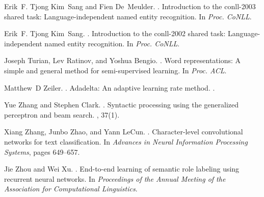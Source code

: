 \documentclass[11pt,letterpaper]{article}
\begin{document}
\begin{thebibliography}{}
Erik~F. Tjong Kim~Sang and Fien De~Meulder.
.
\newblock Introduction to the conll-2003 shared task: Language-independent
  named entity recognition.
\newblock In {\em Proc. CoNLL}.

Erik~F. Tjong Kim~Sang.
.
\newblock Introduction to the conll-2002 shared task: Language-independent
  named entity recognition.
\newblock In {\em Proc. CoNLL}.

Joseph Turian, Lev Ratinov, and Yoshua Bengio.
.
\newblock Word representations: A simple and general method for semi-supervised
  learning.
\newblock In {\em Proc. ACL}.

Matthew~D Zeiler.
.
\newblock Adadelta: An adaptive learning rate method.
.

Yue Zhang and Stephen Clark.
.
\newblock Syntactic processing using the generalized perceptron and beam
  search.
, 37(1).

Xiang Zhang, Junbo Zhao, and Yann LeCun.
.
\newblock Character-level convolutional networks for text classification.
\newblock In {\em Advances in Neural Information Processing Systems}, pages
  649--657.

Jie Zhou and Wei Xu.
.
\newblock End-to-end learning of semantic role labeling using recurrent neural
  networks.
\newblock In {\em Proceedings of the Annual Meeting of the Association for
  Computational Linguistics}.

\end{thebibliography}
\end{document}
